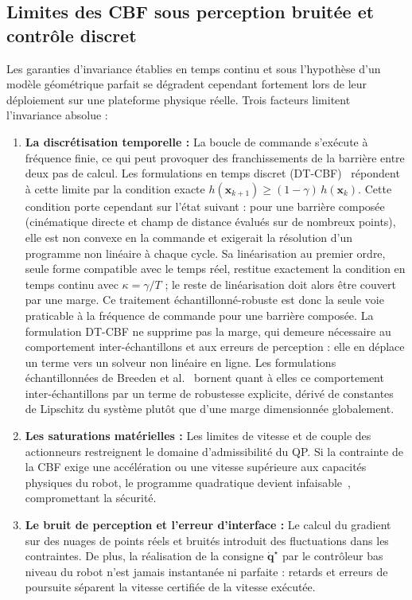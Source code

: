 \subsection{Limites des \acs{CBF} sous perception bruitée et contrôle discret}
Les garanties d'invariance établies en temps continu et sous l'hypothèse d'un modèle géométrique parfait se dégradent cependant fortement lors de leur déploiement sur une plateforme physique réelle. Trois facteurs limitent l'invariance absolue :
\begin{enumerate}
\item \textbf{La discrétisation temporelle :} La boucle de commande s'exécute à fréquence finie, ce qui peut provoquer des franchissements de la barrière entre deux pas de calcul. Les formulations en temps discret (DT-\ac{CBF})~\cite{Agrawal2017Discrete} répondent à cette limite par la condition exacte $h(\mathbf{x}_{k+1}) \geq (1-\gamma)\,h(\mathbf{x}_k)$. Cette condition porte cependant sur l'état suivant : pour une barrière composée (cinématique directe et champ de distance évalués sur de nombreux points), elle est non convexe en la commande et exigerait la résolution d'un programme non linéaire à chaque cycle. Sa linéarisation au premier ordre, seule forme compatible avec le temps réel, restitue exactement la condition en temps continu avec $\kappa=\gamma/T$ ; le reste de linéarisation doit alors être couvert par une marge. Ce traitement échantillonné-robuste est donc la seule voie praticable à la fréquence de commande pour une barrière composée. La formulation DT-\ac{CBF} ne supprime pas la marge, qui demeure nécessaire au comportement inter-échantillons et aux erreurs de perception : elle en déplace un terme vers un solveur non linéaire en ligne. Les formulations échantillonnées de Breeden et al.~\cite{Breeden2022Sampled} bornent quant à elles ce comportement inter-échantillons par un terme de robustesse explicite, dérivé de constantes de Lipschitz du système plutôt que d'une marge dimensionnée globalement.
\item \textbf{Les saturations matérielles :} Les limites de vitesse et de couple des actionneurs restreignent le domaine d'admissibilité du \ac{QP}. Si la contrainte de la \ac{CBF} exige une accélération ou une vitesse supérieure aux capacités physiques du robot, le programme quadratique devient infaisable~\cite{Beaver2024Optimal}, compromettant la sécurité.
\item \textbf{Le bruit de perception et l'erreur d'interface :} Le calcul du gradient sur des nuages de points réels et bruités introduit des fluctuations dans les contraintes. De plus, la réalisation de la consigne $\dot{\mathbf{q}}^\star$ par le contrôleur bas niveau du robot n'est jamais instantanée ni parfaite : retards et erreurs de poursuite séparent la vitesse certifiée de la vitesse exécutée.
\end{enumerate}

